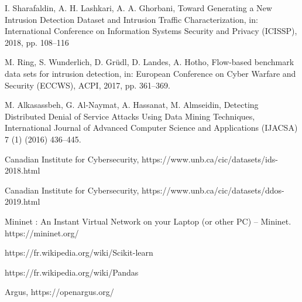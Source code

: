 \begin{thebibliography}{9}
\bibitem{}
I. Sharafaldin, A. H. Lashkari, A. A. Ghorbani, Toward Generating a New Intrusion Detection Dataset and Intrusion Traffic Characterization, in: International Conference on Information Systems Security and Privacy (ICISSP), 2018, pp. 108–116

\bibitem{}
M. Ring, S. Wunderlich, D. Grüdl, D. Landes, A. Hotho, Flow-based benchmark data sets for intrusion detection, in: European Conference on Cyber Warfare and Security (ECCWS), ACPI, 2017, pp. 361–369.

\bibitem{}
M. Alkasassbeh, G. Al-Naymat, A. Hassanat, M. Almseidin, Detecting Distributed Denial of Service Attacks Using Data Mining Techniques, International Journal of Advanced Computer Science and Applications (IJACSA) 7 (1) (2016) 436–445.

\bibitem{}
Canadian Institute for Cybersecurity, https://www.unb.ca/cic/datasets/ids-2018.html

\bibitem{}
Canadian Institute for Cybersecurity, https://www.unb.ca/cic/datasets/ddos-2019.html

\bibitem{}
Mininet : An Instant Virtual Network on your Laptop (or other PC) – Mininet. https://mininet.org/

\bibitem{}
https://fr.wikipedia.org/wiki/Scikit-learn

\bibitem{}
https://fr.wikipedia.org/wiki/Pandas

\bibitem{}
Argus, https://openargus.org/

\end{thebibliography}